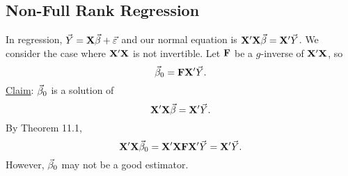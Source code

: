 \subsection*{Non-Full Rank Regression}
In regression, $ \vec{Y}=\mathbf{X}\vec{\beta}+\vec{\varepsilon} $ and
our normal equation is $ \mathbf{X}'\mathbf{X}\vec{\beta}=\mathbf{X}'\vec{Y} $.
We consider the case where $ \mathbf{X}'\mathbf{X} $ is not invertible.
Let $ \mathbf{F} $ be a $ g $-inverse of $ \mathbf{X}'\mathbf{X} $, so
\[ \vec{\beta}_0=\mathbf{F}\mathbf{X}'\vec{Y}. \]
\underline{Claim}: $ \vec{\beta}_0 $ is a solution of
\[ \mathbf{X}'\mathbf{X}\vec{\beta}=\mathbf{X}'\vec{Y}. \]
By Theorem 11.1,
\[ \mathbf{X}'\mathbf{X}\vec{\beta}_0=\mathbf{X}'\mathbf{X}\mathbf{F}\mathbf{X}'\vec{Y}
    =\mathbf{X}'\vec{Y}. \]
However, $ \vec{\beta}_0 $ may not be a good estimator.
